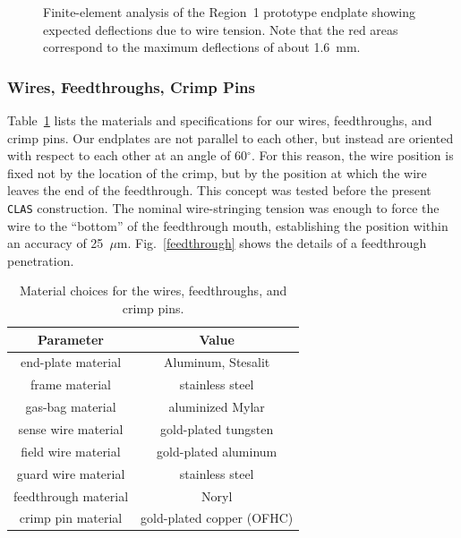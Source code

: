 \begin{figure}[htbp]
\vspace{8.5cm}
\caption{\small{Finite-element analysis of the Region~1 prototype endplate
showing expected deflections due to wire tension.  Note that the red
areas correspond to the maximum deflections of about 1.6~mm.}}
\label{reg1fea}
\end{figure}

\subsubsection{Wires, Feedthroughs, Crimp Pins}

Table~\ref{wirechoices} lists the materials and specifications for our wires, 
feedthroughs, and crimp pins.  Our endplates are not parallel to each other, 
but instead are oriented with respect to each other at an angle of 60$^\circ$.
For this reason, the wire position is fixed not by the location of the crimp, 
but by the position at which the wire leaves the end of the feedthrough.  This 
concept was tested before the present {\tt CLAS} construction.  The nominal 
wire-stringing tension was enough to force the wire to the ``bottom'' of the 
feedthrough mouth, establishing the position within an accuracy of 25~$\mu$m.  
Fig.~\ref{feedthrough} shows the details of a feedthrough penetration.

\begin{table}[htbp]
\begin{center}
\begin{tabular} {||c|c||} \hline \hline
{\bf Parameter}      &  {\bf Value} \\ \hline
end-plate material & Aluminum, Stesalit \\ \hline
frame material & stainless steel \\ \hline
gas-bag material & aluminized Mylar \\ \hline
sense wire material   & gold-plated tungsten \\ \hline
field wire material   & gold-plated aluminum \\ \hline
guard wire material   & stainless steel \\ \hline
feedthrough material & Noryl \\ \hline
crimp pin material & gold-plated copper (OFHC) \\ \hline \hline
\end{tabular}
\caption{\small{Material choices for the wires, feedthroughs, and crimp pins.}}
\label{wirechoices}
\end{center}
\end{table}

